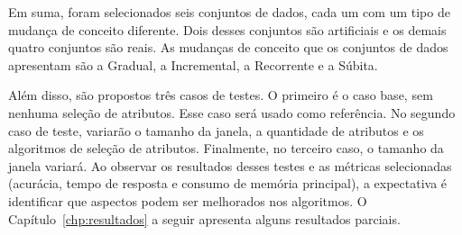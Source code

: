 Em suma, foram selecionados seis conjuntos de dados, cada um com um tipo de mudança de conceito diferente. Dois desses conjuntos são artificiais e os demais quatro conjuntos são reais. As mudanças de conceito que os conjuntos de dados apresentam são a Gradual, a Incremental, a Recorrente e a Súbita.

Além disso, são propostos três casos de testes. O primeiro é o caso base, sem nenhuma seleção de atributos. Esse caso será usado como referência. No segundo caso de teste, variarão o tamanho da janela, a quantidade de atributos e os algoritmos de seleção de atributos. Finalmente, no terceiro caso, o tamanho da janela variará. Ao observar os resultados desses testes e as métricas selecionadas (acurácia, tempo de resposta e consumo de memória principal), a expectativa é identificar que aspectos podem ser melhorados nos algoritmos. O Capítulo~\ref{chp:resultados} a seguir apresenta alguns resultados parciais.